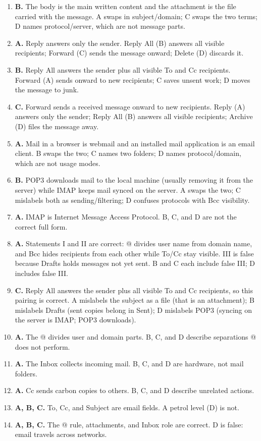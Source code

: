 \documentclass[11pt]{article}
\begin{document}
\begin{enumerate}[label=\textbf{Q\arabic*.}, leftmargin=*]
  attachment (B) is a separate file; the domain (C) is part of the address;
  a protocol (D) is a mail-transfer rule.
\item \textbf{B.} The body is the main written content and the attachment is
  the file carried with the message. A swaps in subject/domain; C swaps the
  two terms; D names protocol/server, which are not message parts.
\item \textbf{A.} Reply answers only the sender. Reply All (B) answers all
  visible recipients; Forward (C) sends the message onward; Delete (D)
  discards it.
\item \textbf{B.} Reply All answers the sender plus all visible To and Cc
  recipients. Forward (A) sends onward to new recipients; C saves unsent
  work; D moves the message to junk.
\item \textbf{C.} Forward sends a received message onward to new recipients.
  Reply (A) answers only the sender; Reply All (B) answers all visible
  recipients; Archive (D) files the message away.
\item \textbf{A.} Mail in a browser is webmail and an installed mail
  application is an email client. B swaps the two; C names two folders; D
  names protocol/domain, which are not usage modes.
\item \textbf{B.} POP3 downloads mail to the local machine (usually removing
  it from the server) while IMAP keeps mail synced on the server. A swaps
  the two; C mislabels both as sending/filtering; D confuses protocols with
  Bcc visibility.
\item \textbf{A.} IMAP is Internet Message Access Protocol. B, C, and D are
  not the correct full form.
\item \textbf{A.} Statements I and II are correct: @ divides user name from
  domain name, and Bcc hides recipients from each other while To/Cc stay
  visible. III is false because Drafts holds messages not yet sent. B and C
  each include false III; D includes false III.
\item \textbf{C.} Reply All answers the sender plus all visible To and Cc
  recipients, so this pairing is correct. A mislabels the subject as a file
  (that is an attachment); B mislabels Drafts (sent copies belong in Sent);
  D mislabels POP3 (syncing on the server is IMAP; POP3 downloads).

\item \textbf{A.} The @ divides user and domain parts. B, C, and D describe separations @ does not perform.
\item \textbf{A.} The Inbox collects incoming mail. B, C, and D are hardware, not mail folders.
\item \textbf{A.} Cc sends carbon copies to others. B, C, and D describe unrelated actions.
\item \textbf{A, B, C.} To, Cc, and Subject are email fields. A petrol level (D) is not.
\item \textbf{A, B, C.} The @ rule, attachments, and Inbox role are correct. D is false: email travels across networks.
\end{enumerate}
\def\JKSSBLessonID{37}\def\JKSSBAnswers{1}
\end{document}
